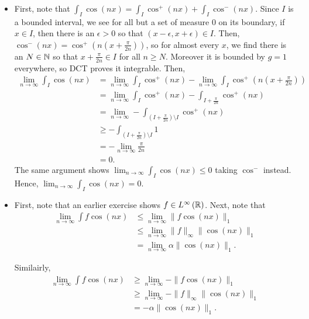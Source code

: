 \documentclass[a4paper]{article}
\begin{document}
\begin{problem}[43]
	\begin{itemize}
		\item First, note that \(\int_{I} \cos\left( nx \right)  = \int_{I} \cos^{+}\left( nx  \right) + \int_{I} \cos^{-}\left( nx  \right)  \). Since \(I\) is a bounded interval, we see for all but a set of measure \(0\) on its boundary, if \(x \in I\), then there is an \(\epsilon > 0\) so that \(\left( x- \epsilon, x + \epsilon \right) \in I \). Then, \(\cos^{-}\left( nx \right)  = \cos^{+}\left( n\left( x + \frac{\pi}{2n} \right)  \right) \), so for almost every \(x\), we find there is an \(N \in \mathbb{N}\) so that \(x + \frac{\pi}{2n} \in I\) for all \(n \ge N\). Moreover it is bounded by \(g=1\) everywhere, so DCT proves it integrable. Then,
			\begin{align*}
				\lim_{n \to \infty} \int_{I} \cos \left( nx \right)  &=  \lim_{n \to \infty} \int _{I} \cos ^{+}\left( nx \right)  - \lim_{n \to \infty} \int_{I} \cos ^{+}\left( n\left( x + \frac{\pi}{2n} \right)  \right)  \\
				&= \lim_{n \to \infty} \int_{I} \cos ^{+}\left( nx \right)  - \int_{I + \frac{\pi}{2n}} \cos^{+}\left( nx  \right)  \\
				&=  \lim_{n \to \infty}- \int _{\left( I+\frac{\pi}{2n} \right) \setminus I} \cos^{+}\left( nx \right)  \\
				&\ge -  \int _{\left( I + \frac{\pi}{2n} \right) \setminus I} 1\\
				&= - \lim_{n \to \infty}\frac{\pi}{2n} \\
				&= 0
			.\end{align*}
			The same argument shows \(\lim_{n \to \infty} \int_{ I } \cos \left( nx \right)  \le 0\) taking \(\cos ^{-}\) instead. Hence, \(\lim_{n \to \infty} \int_{I}\cos\left( nx \right)  = 0\).
		\item First, note that an earlier exercise shows \(f \in L^{\infty}\left( \mathbb{R} \right) \). Next, note that
			\begin{align*}
				\lim_{n \to \infty} \int f \cos\left( nx \right) &\le \lim_{n \to \infty}\|f \cos\left( nx \right)  \|_{1}\\							 &\le \lim_{n \to \infty} \|f\|_{\infty} \|\cos\left( nx \right) \|_{1} \\
				&= \lim_{n \to \infty} \alpha \|\cos\left( nx \right) \|_{1}
			.\end{align*}

			Similairly,
			\begin{align*}
				\lim_{n \to \infty} \int f \cos\left( nx \right) &\ge \lim_{n \to \infty} - \|f \cos\left( nx \right) \|_{1}\\
				&\ge \lim_{n \to \infty} - \|f\|_{\infty} \|\cos\left( nx \right) \|_{1}\\
				&= -\alpha \|\cos\left( nx \right) \|_{1}
			.\end{align*}
			\end{itemize}
\end{problem}
\end{document}
